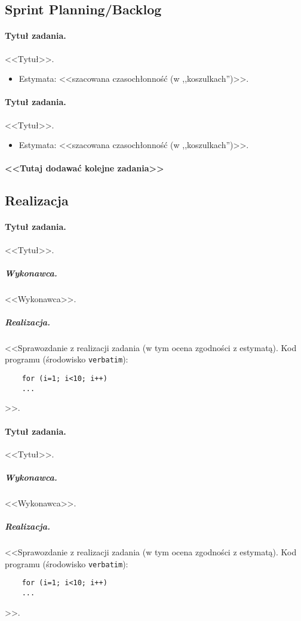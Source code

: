 \documentclass[a4paper]{article}
\begin{document}
	\subsection{Sprint Planning/Backlog}
	
	\paragraph{Tytuł zadania.} <<Tytuł>>.
	\begin{itemize}
		\item Estymata: <<szacowana czasochłonność (w ,,koszulkach'')>>.
	\end{itemize}
	
	\paragraph{Tytuł zadania.} <<Tytuł>>.
	\begin{itemize}
		\item Estymata: <<szacowana czasochłonność (w ,,koszulkach'')>>.
	\end{itemize}
	
	\paragraph{<<Tutaj dodawać kolejne zadania>>}
	
	\subsection{Realizacja}
	
	\paragraph{Tytuł zadania.} <<Tytuł>>.
	\subparagraph{Wykonawca.} <<Wykonawca>>.
	\subparagraph{Realizacja.} <<Sprawozdanie z realizacji zadania (w tym ocena zgodności z estymatą). Kod programu (środowisko \texttt{verbatim}): \begin{verbatim}
	for (i=1; i<10; i++)
	...
	\end{verbatim}>>.
	
	\paragraph{Tytuł zadania.} <<Tytuł>>.
	\subparagraph{Wykonawca.} <<Wykonawca>>.
	\subparagraph{Realizacja.} <<Sprawozdanie z realizacji zadania (w tym ocena zgodności z estymatą). Kod programu (środowisko \texttt{verbatim}): \begin{verbatim}
	for (i=1; i<10; i++)
	...
	\end{verbatim}>>.
	
\end{document}
